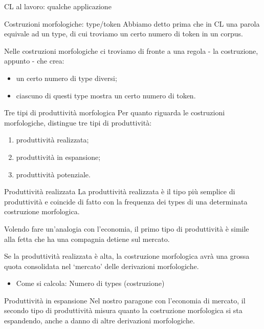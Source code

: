 \documentclass[pdf]{prosper}
\begin{document}
\begin{tsectionandpart}{CL al lavoro: qualche applicazione}
\begin{slide}{Costruzioni morfologiche: type/token}
Abbiamo detto prima che in CL una parola equivale ad un type, di cui troviamo un certo numero di token in un corpus.

Nelle costruzioni morfologiche ci troviamo di fronte a una regola - la costruzione, appunto - che crea:

	\begin{itemize}
	\item un certo numero di type diversi;
	\item ciascuno di questi type mostra un certo numero di token.
	\end{itemize}
\end{slide}

\begin{slide}{Tre tipi di produttività morfologica}
Per quanto riguarda le costruzioni morfologiche, \citealt{Baayen2009} distingue tre tipi di produttività:

	\begin{enumerate}
		\item produttività realizzata;
		\item produttività in espansione;
		\item produttività potenziale.
	\end{enumerate}	

\end{slide}

\begin{slide}{Produttività realizzata}
La produttività realizzata è il tipo più semplice di produttività e coincide di fatto con la frequenza dei types di una determinata costruzione morfologica.

Volendo fare un'analogia con l'economia, il primo tipo di produttività è simile alla fetta che ha una compagnia detiene sul mercato.

Se la produttività realizzata è alta, la costruzione morfologica avrà una grossa quota consolidata nel `mercato' delle derivazioni morfologiche.


	\begin{itemize}
		\item Come si calcola: Numero di types (costruzione)
	\end{itemize}

\end{slide}

\begin{slide}{Produttività in espansione}
Nel nostro paragone con l'economia di mercato, il secondo tipo di produttività misura quanto la costruzione morfologica si sta espandendo, anche a danno di altre derivazioni morfologiche. 


\end{slide}
\end{tsectionandpart}
\end{document}
